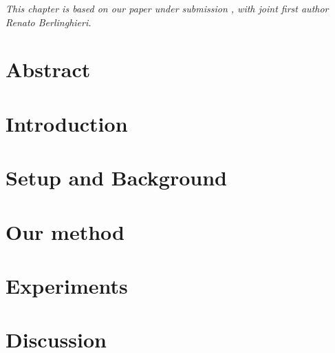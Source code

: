 

\textit{This chapter is based on our paper under submission \citep{berlinghieri2025oh}, with joint first author Renato Berlinghieri.} 

\section*{Abstract}


\section{Introduction}
\label{snapsec:intro}




\section{Setup and Background}
\label{snapsec:setup}


\section{Our method}
\label{snapsec:method}




\section{Experiments}
\label{snapsec:experiments}





\section{Discussion}
\label{snapsec:discussion}
